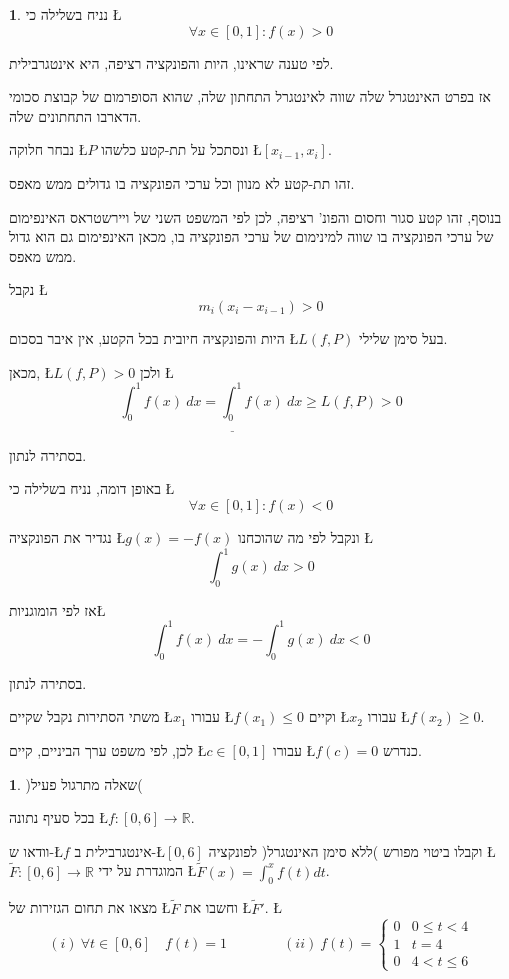 \documentclass[english,hebrew]{article}
\theoremstyle{plain}
\theoremstyle{definition}
\newtheorem{xca}[thm]{\protect\exercisename}
\theoremstyle{definition}
\newtheorem*{sol*}{\protect\solutionname}
\providecommand{\exercisename}{תרגיל}
\providecommand{\solutionname}{פתרון}
\begin{document}
\begin{sol*}
נניח בשלילה כי \L{%
\[
\forall x\in\left[0,1\right]:f(x)>0
\]
}%

לפי טענה שראינו, היות והפונקציה רציפה, היא אינטגרבילית.

אז בפרט האינטגרל שלה שווה לאינטגרל התחתון שלה, שהוא הסופרמום של קבוצת
סכומי הדארבו התחתונים שלה.

נבחר חלוקה \L{$P$} ונסתכל על תת-קטע כלשהו \L{$\left[x_{i-1},x_{i}\right]$}. 

זהו תת-קטע לא מנוון וכל ערכי הפונקציה בו גדולים ממש מאפס.

בנוסף, זהו קטע סגור וחסום והפונ' רציפה, לכן לפי המשפט השני של ויירשטראס
האינפימום של ערכי הפונקציה בו שווה למינימום של ערכי הפונקציה בו, מכאן
האינפימום גם הוא גדול ממש מאפס.

נקבל \L{%
\[
m_{i}\left(x_{i}-x_{i-1}\right)>0
\]
}%

היות והפונקציה חיובית בכל הקטע, אין איבר בסכום \L{$L\left(f,P\right)$}
בעל סימן שלילי.

מכאן, \L{$L\left(f,P\right)>0$} ולכן \L{%
\[
\int_{0}^{1}f(x)\ dx=\underline{\int_{0}^{1}}f(x)\ dx\ge L\left(f,P\right)>0
\]
}%

בסתירה לנתון.

באופן דומה, נניח בשלילה כי \L{%
\[
\forall x\in\left[0,1\right]:f(x)<0
\]
}%

נגדיר את הפונקציה \L{$g(x)=-f(x)$} ונקבל לפי מה שהוכחנו \L{%
\[
\int_{0}^{1}g(x)\ dx>0
\]
}%

אז לפי הומוגניות\L{%
\[
\int_{0}^{1}f(x)\ dx=-\int_{0}^{1}g(x)\ dx<0
\]
}%

בסתירה לנתון.

משתי הסתירות נקבל שקיים \L{$x_{1}$} עבורו \L{$f\left(x_{1}\right)\le0$}
וקיים \L{$x_{2}$} עבורו \L{$f\left(x_{2}\right)\ge0$}.

לכן, לפי משפט ערך הביניים, קיים \L{$c\in\left[0,1\right]$} עבורו
\L{$f\left(c\right)=0$} כנדרש.
\end{sol*}
\begin{xca}
)שאלה מתרגול פעיל(

בכל סעיף נתונה \L{$f:[0,6]\to\mathbb{R}$}.

וודאו ש-\L{$f$} אינטגרבילית ב-\L{$[0,6]$} וקבלו ביטוי מפורש )ללא
סימן האינטגרל( לפונקציה \L{$\tilde{F}:[0,6]\to\mathbb{R}$} המוגדרת
על ידי \L{$\tilde{F}(x)=\int_{0}^{x}f(t)dt$}.

מצאו את תחום הגזירות של \L{$\tilde{F}$} וחשבו את \L{$\tilde{F}'$}.
\L{%
\[
(i)\ \forall t\in[0,6]\quad f(t)=1\qquad\qquad(ii)\ f(t)=\begin{cases}
0 & 0\le t<4\\
1 & t=4\\
0 & 4<t\le6
\end{cases}
\]
}%
\end{xca}
\end{document}
